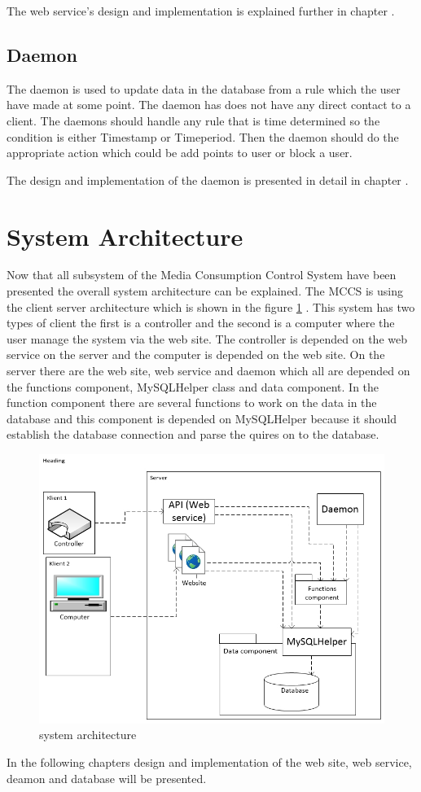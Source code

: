 The web service's design and implementation is explained further in chapter .


\subsection{Daemon}
The daemon is used to update data in the database from a rule which the user have made at some point. The daemon has does not have any direct contact to a client. The daemons should handle any rule that is time determined so the condition is either Timestamp or Timeperiod. Then the daemon should do the appropriate action which could be add points to user or block a user.

The design and implementation of the daemon is presented in detail in chapter . 
 
\section{System Architecture}
\label{sec:sysArchitecture}
Now that all subsystem of the Media Consumption Control System have been presented the overall system architecture can be explained. The MCCS is using the client server architecture which is shown in the figure \ref{fig:serveroverview} \citep{OOAD}. This system has two types of client the first is a controller and the second is a computer where the user manage the system via the web site. The controller is depended on the web service on the server and the computer is depended on the web site. On the server there are the web site, web service and daemon which all are depended on the functions component, MySQLHelper class and data component. In the function component there are several functions to work on the data in the database and this component is depended on MySQLHelper because it should establish the database connection and parse the quires on to the database. 

\begin{figure}
	\centering
		\includegraphics[width=1.00\textwidth]{images/serveroverview.jpg}
	\caption{system architecture}
	\label{fig:serveroverview}
\end{figure}

In the following chapters design and implementation of the web site, web service, deamon and database will be presented.

 


